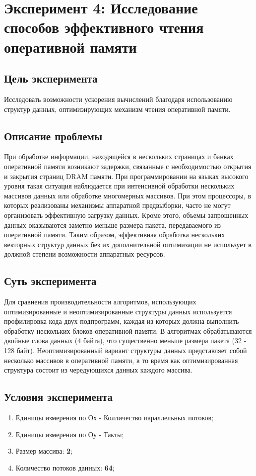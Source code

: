 \chapter{Эксперимент 4: Исследование способов эффективного чтения оперативной памяти}

\section{Цель эксперимента}
Исследовать возможности ускорения вычислений благодаря использованию структур данных, оптимизирующих механизм чтения оперативной памяти. 

\section{Описание проблемы}
При  обработке информации, находящейся в нескольких страницах и банках оперативной памяти возникают задержки, связанные с необходимостью открытия и закрытия страниц DRAM памяти. При программировании на языках высокого уровня такая ситуация наблюдается при интенсивной обработки нескольких массивов данных или обработке многомерных массивов. При этом процессоры, в которых реализованы механизмы аппаратной предвыборки, часто не могут организовать эффективную загрузку данных. Кроме этого, объемы запрошенных данных оказываются заметно меньше размера пакета, передаваемого из оперативной памяти. Таким образом, эффективная обработка нескольких векторных структур данных без их дополнительной оптимизации не использует в должной степени возможности аппаратных ресурсов. 

\section{Суть эксперимента}
Для сравнения производительности алгоритмов, использующих оптимизированные и неоптимизированные структуры данных используется профилировка кода двух подпрограмм, каждая из которых должна выполнить обработку нескольких блоков оперативной памяти. В алгоритмах обрабатываются двойные слова данных (4 байта), что существенно меньше размера пакета (32 - 128 байт). Неоптимизированный вариант структуры данных представляет собой несколько массивов в оперативной памяти, в то время как оптимизированная структура состоит из чередующихся данных каждого массива.

\section{Условия эксперимента}
\begin{enumerate}
    \item Единицы измерения по Ох - Колличество параллельных потоков;
    \item Единицы измерения по Оу - Такты;
    \item Размер массива: \textbf{2};
    \item Количество потоков данных: \textbf{64};
\end{enumerate}

